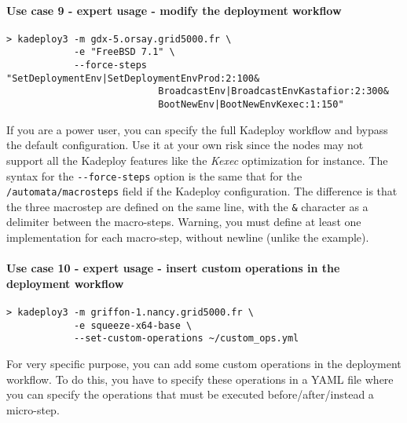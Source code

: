 \documentclass[a4wide,10pt,oneside]{book}
\newcommand{\ypath}[1]{\texttt{#1}}
\begin{document}
\paragraph{Use case 9 - expert usage - modify the deployment workflow}
\begin{verbatim}
> kadeploy3 -m gdx-5.orsay.grid5000.fr \
            -e "FreeBSD 7.1" \
            --force-steps "SetDeploymentEnv|SetDeploymentEnvProd:2:100&
                           BroadcastEnv|BroadcastEnvKastafior:2:300&
                           BootNewEnv|BootNewEnvKexec:1:150"
\end{verbatim}
If you are a power user, you can specify the full Kadeploy workflow and bypass the default configuration. Use it at your own risk since the nodes may not support all the Kadeploy features like the \textit{Kexec} optimization for instance. The syntax for the \texttt{-{}-force-steps} option is the same that for the \ypath{/automata/macrosteps} field if the Kadeploy configuration. The difference is that the three macrostep are defined on the same line, with the \texttt{\&} character as a delimiter between the macro-steps. Warning, you must define at least one implementation for each macro-step, without newline (unlike the example).

\paragraph{Use case 10 - expert usage - insert custom operations in the deployment workflow}
\begin{verbatim}
> kadeploy3 -m griffon-1.nancy.grid5000.fr \
            -e squeeze-x64-base \
            --set-custom-operations ~/custom_ops.yml
\end{verbatim}
For very specific purpose, you can add some custom operations in the deployment workflow. To do this, you have to specify these operations in a YAML file where you can specify the operations that must be executed before/after/instead a micro-step.
\end{document}
